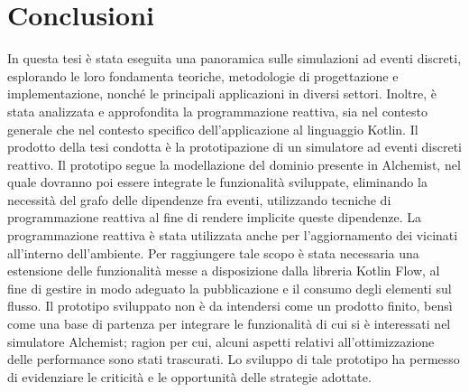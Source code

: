 \documentclass[12pt,a4paper,openright,twoside]{book}
\begin{document}
\chapter{Conclusioni}
In questa tesi è stata eseguita una panoramica sulle simulazioni ad eventi discreti, esplorando le loro fondamenta teoriche, metodologie di progettazione e implementazione, nonché le principali applicazioni in diversi settori. Inoltre, è stata analizzata e approfondita la programmazione reattiva, sia nel contesto generale che nel contesto specifico dell'applicazione al linguaggio Kotlin.
Il prodotto della tesi condotta è la prototipazione di un simulatore ad eventi discreti reattivo. Il prototipo segue la modellazione del dominio presente in Alchemist, nel quale dovranno poi essere integrate le funzionalità sviluppate, eliminando la necessità del grafo delle dipendenze fra eventi, utilizzando tecniche di programmazione reattiva al fine di rendere implicite queste dipendenze. La programmazione reattiva è stata utilizzata anche per l'aggiornamento dei vicinati all'interno dell'ambiente. 
Per raggiungere tale scopo è stata necessaria una estensione delle funzionalità messe a disposizione dalla libreria Kotlin Flow, al fine di gestire in modo adeguato la pubblicazione e il consumo degli elementi sul flusso. 
Il prototipo sviluppato non è da intendersi come un prodotto finito, bensì come una base di partenza per integrare le funzionalità di cui si è interessati nel simulatore Alchemist; ragion per cui, alcuni aspetti relativi all'ottimizzazione delle performance sono stati trascurati. 
Lo sviluppo di tale prototipo ha permesso di evidenziare le criticità e le opportunità delle strategie adottate. 

\backmatter



\end{document}
